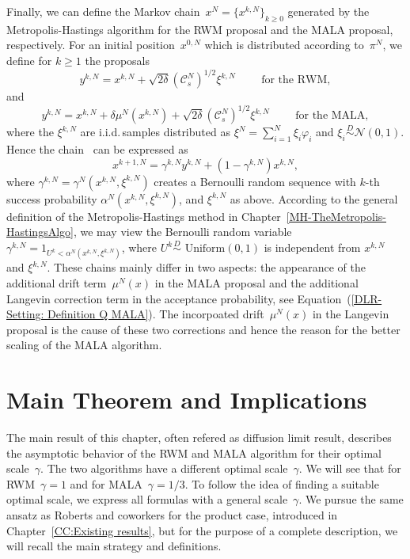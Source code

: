 Finally, we can define the Markov chain~$x^N = \{ x^{k,N} \}_{k \geq 0}$  generated by the Metropolis-Hastings algorithm for the RWM proposal and the MALA proposal, respectively. For an initial position~$x^{0,N}$ which is distributed according to~$\pi^N$, we define for $k \geq 1$ the proposals
\begin{equation}
 y^{k,N} = x^{k,N} + \sqrt{2 \delta} (\mathcal{C}_s^{N})^{1/2} \xi^{k,N} \qquad \text{ for the RWM},
\end{equation}
and
\begin{equation}
 y^{k,N} = x^{k,N} + \delta \mu^{N}(x^{k,N}) + \sqrt{2 \delta} (\mathcal{C}_s^{N})^{1/2} \xi^{k,N} \qquad \text{ for the MALA},
\end{equation}
where the $\xi^{k,N}$ are i.i.d.\,samples distributed as $\xi^{N} = \sum_{i=1}^{N} \xi_i \varphi_i$ and $\xi_i \stackrel{D}{\sim} \mathcal{N}(0,1)$. Hence the chain~\autocite[Equation~(2.12) and~(2.20), respectively]{Mattingly2010, Pillai2012} can be expressed as
\begin{equation}
\label{DLR-MH chain from algorithm - general form}
 x^{k+1,N} = \gamma^{k,N} y^{k,N} + (1 - \gamma^{k,N}) x^{k,N},
\end{equation}
where  $\gamma^{k,N}= \gamma^{N}(x^{k,N}, \xi^{k,N})$ creates a Bernoulli random sequence with $k$-th success probability $\alpha^{N}(x^{k,N}, \xi^{k,N})$, and $\xi^{k,N}$ as above. According to the general definition of the Metropolis-Hastings method in Chapter~\ref{MH-TheMetropolis-HastingsAlgo}, we may view the Bernoulli random variable~$\gamma^{k,N} = 1_{U^k < \alpha^N(x^{k,N}, \xi^{k,N})}$, where $U^k\stackrel{D}{\sim} \text{ Uniform}(0,1)$ is independent from $x^{k,N}$ and $\xi^{k,N}$. These chains mainly differ in two aspects: the appearance of the additional drift term~$\mu^{N}(x)$ in the MALA proposal and the additional Langevin correction term in the acceptance probability, see Equation~(\ref{DLR-Setting: Definition Q MALA}). The incorpoated drift~$\mu^N(x)$ in the Langevin proposal is the cause of these two corrections and hence the reason for the better scaling of the MALA algorithm. 


\section{Main Theorem and Implications}
\label{sec:DLR-Main theorem}

The main result of this chapter, often refered as diffusion limit result, describes the asymptotic behavior of the RWM and MALA algorithm for their optimal scale~$\gamma$. The two algorithms have a different optimal scale~$\gamma$. We will see that for RWM~$\gamma = 1$ and for MALA~$\gamma = 1/3$. To follow the idea of finding a suitable optimal scale, we express all formulas with a general scale~$\gamma$. We pursue the same ansatz as Roberts and coworkers for the product case, introduced in Chapter~\ref{CC:Existing results}, but for the purpose of a complete description, we will recall the main strategy and definitions.

